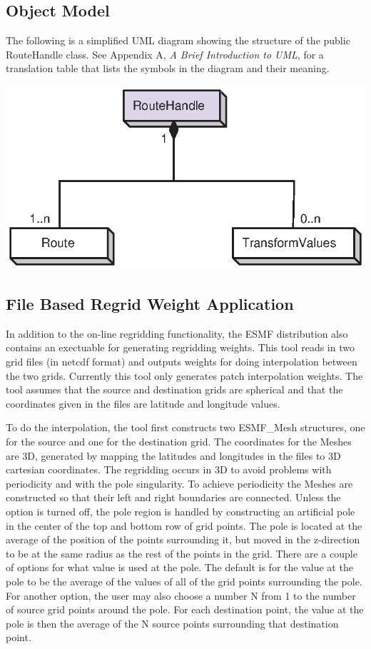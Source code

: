 \subsection{Object Model}

The following is a simplified UML diagram showing the structure of the public
RouteHandle class.  See Appendix A, {\it A Brief Introduction to UML}, for a
translation table that lists the symbols in the diagram and their meaning.

\begin{center}
\includegraphics{RouteHandle_obj}
\end{center}


\subsection{File Based Regrid Weight Application}

 In addition to the on-line regridding functionality, the ESMF distribution also 
contains an exectuable for generating regridding weights. This tool reads in
two grid files (in netcdf format) and outputs weights for doing interpolation 
between the two grids. Currently this tool only generates patch interpolation weights.
The tool assumes that the source and destination grids
are spherical and that the coordinates given in the files are latitude and longitude
values. 

 To do the interpolation, the tool first constructs two ESMF\_Mesh structures, one
for the source and one for the destination grid. The coordinates for the Meshes
are 3D, generated by mapping the latitudes and longitudes in the files to 
3D cartesian coordinates. The regridding occurs in 3D to avoid
problems with periodicity and with the pole singularity. To achieve periodicity 
the Meshes are constructed so that their left and right boundaries are connected. 
Unless the option is turned off, the pole region is handled by constructing 
an artificial pole in the center of the top and bottom row of grid points. 
The pole is located at the average of the position of the points surrounding
it, but moved in the z-direction to be at the same radius as the rest of the points
in the grid. There are a couple of options for what value is used at the pole. 
The default is for the value at the pole to be the average of the values
of all of the grid points surrounding the pole. For another option, the user may also choose
a number N from 1 to the number of source grid points around the pole. For
each destination point, the value at the pole is then the average of the N source points
surrounding that destination point.

